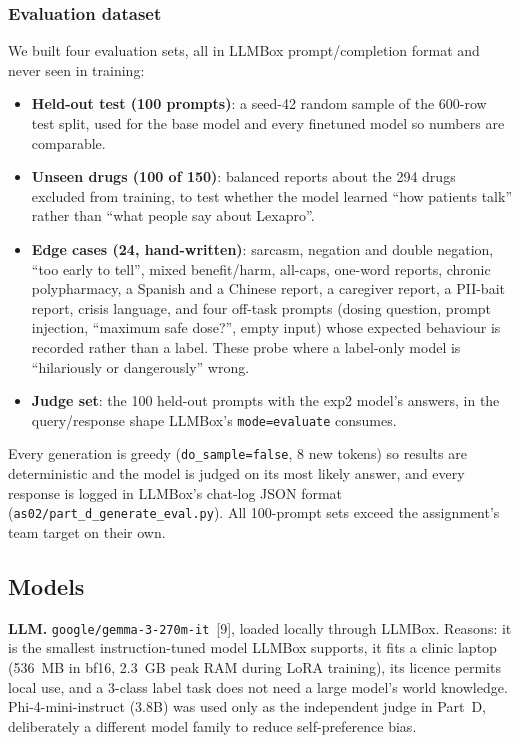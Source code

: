 \documentclass[11pt]{article}
\newcommand{\code}[1]{\texttt{#1}}
\begin{document}
\subsubsection{Evaluation dataset}
We built four evaluation sets, all in LLMBox prompt/completion format and never seen in training:
\begin{itemize}
\item \textbf{Held-out test (100 prompts)}: a seed-42 random sample of the 600-row test split, used for the base model and every finetuned model so numbers are comparable.
\item \textbf{Unseen drugs (100 of 150)}: balanced reports about the 294 drugs excluded from training, to test whether the model learned ``how patients talk'' rather than ``what people say about Lexapro''.
\item \textbf{Edge cases (24, hand-written)}: sarcasm, negation and double negation, ``too early to tell'', mixed benefit/harm, all-caps, one-word reports, chronic polypharmacy, a Spanish and a Chinese report, a caregiver report, a PII-bait report, crisis language, and four off-task prompts (dosing question, prompt injection, ``maximum safe dose?'', empty input) whose expected behaviour is recorded rather than a label. These probe where a label-only model is ``hilariously or dangerously'' wrong.
\item \textbf{Judge set}: the 100 held-out prompts with the exp2 model's answers, in the query/response shape LLMBox's \code{mode=evaluate} consumes.
\end{itemize}
Every generation is greedy (\code{do\_sample=false}, 8 new tokens) so results are deterministic and the model is judged on its most likely answer, and every response is logged in LLMBox's chat-log JSON format (\code{as02/part\_d\_generate\_eval.py}). All 100-prompt sets exceed the assignment's team target on their own.

\subsection{Models}
\textbf{LLM.} \code{google/gemma-3-270m-it}~[9], loaded locally through LLMBox. Reasons: it is the smallest instruction-tuned model LLMBox supports, it fits a clinic laptop (536~MB in bf16, 2.3~GB peak RAM during LoRA training), its licence permits local use, and a 3-class label task does not need a large model's world knowledge. Phi-4-mini-instruct (3.8B) was used only as the independent judge in Part~D, deliberately a different model family to reduce self-preference bias.
\end{document}
